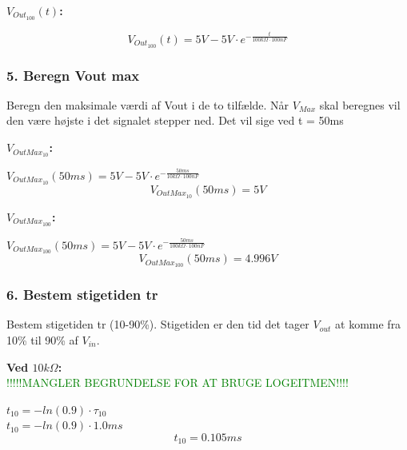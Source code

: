 






\textbf{$V_{Out_{100}}(t)$:}
\begin{center}
\begin{equation}
V_{Out_{100}}(t) = 5V-5V \cdot e^{-\frac{t}{100k\Omega \cdot 100nF}} 
\label{V_Out_100}
\end{equation}
\end{center}




\subsubsection*{5. Beregn Vout max}
Beregn den maksimale værdi af Vout i de to tilfælde.
Når $V_{Max}$ skal beregnes vil den være højste i det signalet stepper ned. Det vil sige ved t = 50ms

\textbf{$V_{OutMax_10}$:}

\begin{center}
$V_{OutMax_{10}}(50ms) = 5V-5V \cdot e^{-\frac{50ms}{10k\Omega \cdot 100nF}} $
\begin{equation}
V_{OutMax_{10}}(50ms)=5V
\label{V_OutMax_10}
\end{equation}
\end{center}

\textbf{$V_{OutMax_100}$:}

\begin{center}
$V_{OutMax_{100}}(50ms) = 5V-5V \cdot e^{-\frac{50ms}{100k\Omega \cdot 100nF}} $
\begin{equation}
V_{OutMax_{100}}(50ms)=4.996V
\label{V_OutMax_100}
\end{equation}
\end{center}


\subsubsection*{6. Bestem stigetiden tr}
Bestem stigetiden tr (10-90\%).
Stigetiden er den tid det tager $V_{out}$ at komme fra 10\% til 90\% af $V_{in}$.

\textbf{Ved $10k\Omega$:}\\
\textcolor{green}{!!!!!MANGLER BEGRUNDELSE FOR AT BRUGE LOGEITMEN!!!!}
\begin{center}
$t_{10}=-ln(0.9)\cdot \tau_{10}$\\
$t_{10}=-ln(0.9)\cdot 1.0 ms$
\begin{equation}
t_{10}= 0.105 ms
\label{t_10_10}
\end{equation}
\end{center}


